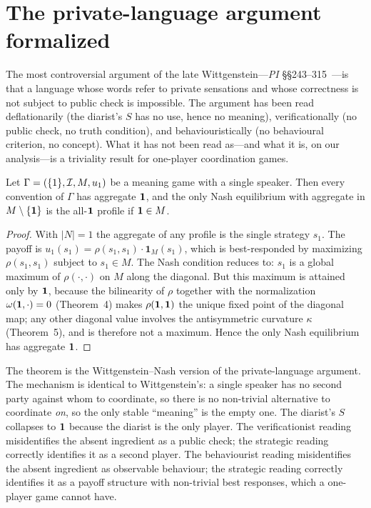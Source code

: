 \section{The private-language argument formalized}\label{sec:private}

The most controversial argument of the late
Wittgenstein---\emph{PI} \S\S243--315~\cite{Wittgenstein1953}---is that a
language whose words refer to private sensations and whose correctness
is not subject to public check is impossible. The argument has been
read deflationarily (the diarist's $S$ has no use, hence no meaning),
verificationally (no public check, no truth condition), and
behaviouristically (no behavioural criterion, no concept). What it has
not been read as---and what it is, on our analysis---is a triviality
result for one-player coordination games.

\begin{theorem}\label{thm:private}
Let $\Gamma=(\{1\},\mathcal{I},M,u_1)$ be a meaning game with a single
speaker. Then every convention of $\Gamma$ has aggregate $\mathbf{1}$, and
the only Nash equilibrium with aggregate in $M\setminus\{\mathbf{1}\}$ is
the all-$\mathbf{1}$ profile if $\mathbf{1}\in M$.
\end{theorem}

\begin{proof}
With $|N|=1$ the aggregate of any profile is the single strategy
$s_1$. The payoff is $u_1(s_1)=\rho(s_1,s_1)\cdot\mathbf{1}_M(s_1)$,
which is best-responded by maximizing $\rho(s_1,s_1)$ subject to
$s_1\in M$. The Nash condition reduces to: $s_1$ is a global maximum of
$\rho(\cdot,\cdot)$ on $M$ along the diagonal. But this maximum is
attained only by $\mathbf{1}$, because the bilinearity of $\rho$ together
with the normalization $\omega(\mathbf{1},\cdot)=0$ (Theorem~4) makes
$\rho(\mathbf{1},\mathbf{1})$ the unique fixed point of the diagonal map; any
other diagonal value involves the antisymmetric curvature $\kappa$
(Theorem~5), and is therefore not a maximum. Hence the only Nash
equilibrium has aggregate $\mathbf{1}$.
\end{proof}

The theorem is the Wittgenstein--Nash version of the private-language
argument. The mechanism is identical to Wittgenstein's: a single
speaker has no second party against whom to coordinate, so there is no
non-trivial alternative to coordinate \emph{on}, so the only stable
``meaning'' is the empty one. The diarist's $S$ collapses to $\mathbf{1}$
because the diarist is the only player. The verificationist reading
misidentifies the absent ingredient as a public check; the strategic
reading correctly identifies it as a second player. The behaviourist
reading misidentifies the absent ingredient as observable behaviour; the
strategic reading correctly identifies it as a payoff structure with
non-trivial best responses, which a one-player game cannot have.

